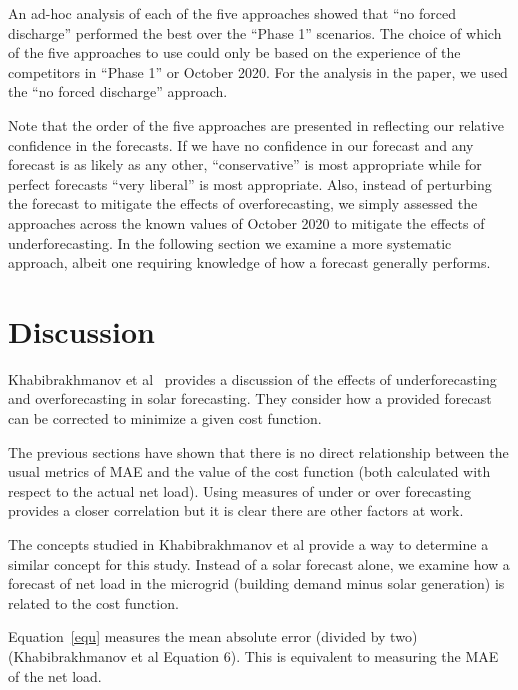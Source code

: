 \documentclass[conference]{IEEEtran}
\begin{document}
An ad-hoc analysis of each of the five approaches showed that ``no forced discharge'' performed the best over the ``Phase 1'' scenarios. The choice of which of the five approaches to use could only be based on the experience of the competitors in ``Phase 1'' or October 2020. For the analysis in the paper, we used the ``no forced discharge'' approach.

Note that the order of the five approaches are presented in reflecting our relative confidence in the forecasts. If we have no confidence in our forecast and any forecast is as likely as any other, ``conservative'' is most appropriate while for perfect forecasts ``very liberal'' is most appropriate. Also, instead of perturbing the forecast to mitigate the effects of overforecasting, we simply assessed the approaches across the known values of October 2020 to mitigate the effects of underforecasting. In the following section we examine a more systematic approach, albeit one requiring knowledge of how a forecast generally performs.

\section{Discussion}\label{disc} 
Khabibrakhmanov et al~\cite{Khabibrakhmanov} provides a discussion of the effects of underforecasting and overforecasting in solar forecasting. They consider how a provided forecast can be corrected to minimize a given cost function. 

The previous sections have shown that there is no direct relationship between the usual metrics of MAE and the value of the cost function (both calculated with respect to the actual net load). Using measures of under or over forecasting provides a closer correlation but it is clear there are other factors at work.


The concepts studied in Khabibrakhmanov et al provide a way to determine a similar concept for this study. Instead of a solar forecast alone, we examine how a forecast of net load in the microgrid (building demand minus solar generation) is related to the cost function.

Equation~\ref{equ} measures the mean absolute error (divided by two) (Khabibrakhmanov et al Equation 6). This is equivalent to measuring the MAE of the net load.
\end{document}
